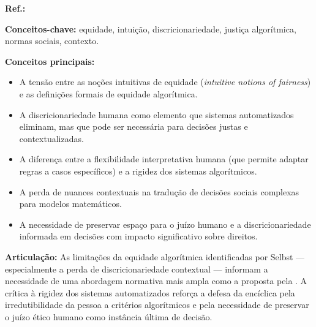 \begin{fichamento}
    \textbf{Ref.:} \cite{Selbst2018INC}
    
    \textbf{Conceitos-chave:} equidade, intuição, discricionariedade, justiça algorítmica, normas sociais, contexto.
    
    \textbf{Conceitos principais:}
    \begin{itemize}
        \item A tensão entre as noções intuitivas de equidade (\textit{intuitive notions of fairness}) e as definições formais de equidade algorítmica.
        \item A discricionariedade humana como elemento que sistemas automatizados eliminam, mas que pode ser necessária para decisões justas e contextualizadas.
        \item A diferença entre a flexibilidade interpretativa humana (que permite adaptar regras a casos específicos) e a rigidez dos sistemas algorítmicos.
        \item A perda de nuances contextuais na tradução de decisões sociais complexas para modelos matemáticos.
        \item A necessidade de preservar espaço para o juízo humano e a discricionariedade informada em decisões com impacto significativo sobre direitos.
    \end{itemize}
    
    \textbf{Articulação:} As limitações da equidade algorítmica identificadas por Selbst — especialmente a perda de discricionariedade contextual — informam a necessidade de uma abordagem normativa mais ampla como a proposta pela \MH{}. A crítica à rigidez dos sistemas automatizados reforça a defesa da encíclica pela irredutibilidade da pessoa a critérios algorítmicos e pela necessidade de preservar o juízo ético humano como instância última de decisão.
\end{fichamento}

